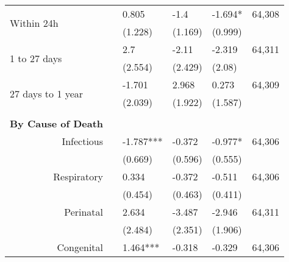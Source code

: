 \begin{table}[H]
\begin{footnotesize}
\begin{center}
{\begin{threeparttable}[b]
\begin{tabular}{rrrrrr}
    \multicolumn{1}{l}{\multirow{2}[0]{*}{Within 24h}} &       & \multicolumn{1}{l}{0.805} & \multicolumn{1}{l}{-1.4} & \multicolumn{1}{l}{-1.694*} & \multicolumn{1}{c}{     64,308 } \\
          &       & \multicolumn{1}{l}{(1.228)} & \multicolumn{1}{l}{(1.169)} & \multicolumn{1}{l}{(0.999)} &  \\
    \multicolumn{1}{l}{\multirow{2}[0]{*}{1 to 27 days}} &       & \multicolumn{1}{l}{2.7} & \multicolumn{1}{l}{-2.11} & \multicolumn{1}{l}{-2.319} & \multicolumn{1}{c}{     64,311 } \\
          &       & \multicolumn{1}{l}{(2.554)} & \multicolumn{1}{l}{(2.429)} & \multicolumn{1}{l}{(2.08)} &  \\
    \multicolumn{1}{l}{\multirow{2}[0]{*}{27 days to 1 year}} &       & \multicolumn{1}{l}{-1.701} & \multicolumn{1}{l}{2.968} & \multicolumn{1}{l}{0.273} & \multicolumn{1}{c}{     64,309 } \\
          &       & \multicolumn{1}{l}{(2.039)} & \multicolumn{1}{l}{(1.922)} & \multicolumn{1}{l}{(1.587)} &  \\
          &       &       &       &       &  \\
    \multicolumn{1}{p{15.145em}}{\textbf{By Cause of Death}} &       &       &       &       &  \\
    \multicolumn{1}{p{15.145em}}{Infectious} &       & \multicolumn{1}{l}{-1.787***} & \multicolumn{1}{l}{-0.372} & \multicolumn{1}{l}{-0.977*} & \multicolumn{1}{c}{     64,306 } \\
          &       & \multicolumn{1}{l}{(0.669)} & \multicolumn{1}{l}{(0.596)} & \multicolumn{1}{l}{(0.555)} &  \\
    \multicolumn{1}{p{15.145em}}{Respiratory} &       & \multicolumn{1}{l}{0.334} & \multicolumn{1}{l}{-0.372} & \multicolumn{1}{l}{-0.511} & \multicolumn{1}{c}{     64,306 } \\
          &       & \multicolumn{1}{l}{(0.454)} & \multicolumn{1}{l}{(0.463)} & \multicolumn{1}{l}{(0.411)} &  \\
    \multicolumn{1}{p{15.145em}}{Perinatal} &       & \multicolumn{1}{l}{2.634} & \multicolumn{1}{l}{-3.487} & \multicolumn{1}{l}{-2.946} & \multicolumn{1}{c}{     64,311 } \\
          &       & \multicolumn{1}{l}{(2.484)} & \multicolumn{1}{l}{(2.351)} & \multicolumn{1}{l}{(1.906)} &  \\
    \multicolumn{1}{p{15.145em}}{Congenital} &       & \multicolumn{1}{l}{1.464***} & \multicolumn{1}{l}{-0.318} & \multicolumn{1}{l}{-0.329} & \multicolumn{1}{c}{     64,306 } \\

\end{tabular}
\end{threeparttable}}
\end{center}
\end{footnotesize}
\end{table}
